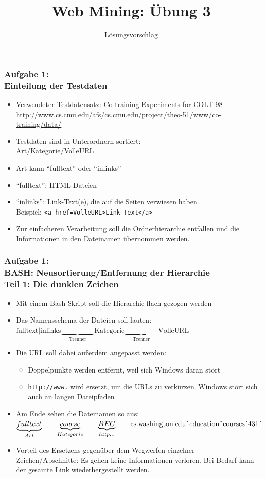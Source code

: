 \documentclass[accentcolor=tud7b,noresetcounter]{tudbeamer}
\title%
{Web Mining: Übung 3}
\subtitle{Lösungsvorschlag}
\author[Ingo Adrian und Steffen Pegenau]{}
\institute[Fachbereich Informatik]{}
\date[\today]
\begin{document}
  
  \begin{titleframe}
  \end{titleframe}
  
  \begin{frame}
  \frametitle{Aufgabe 1:\\ Einteilung der Testdaten}
  \begin{itemize}
    \item Verwendeter Testdatensatz: Co-training Experiments for COLT 98\\
    \url{http://www.cs.cmu.edu/afs/cs.cmu.edu/project/theo-51/www/co-training/data/}
    \item Testdaten sind in Unterordnern sortiert:\\
    	  Art/Kategorie/VolleURL
   \item Art kann "`fulltext"' oder "`inlinks"'
   \item "`fulltext"': HTML-Dateien
   \item "`inlinks"': Link-Text(e), die auf die Seiten verwiesen haben. \\
	Beispiel: \texttt{<a href=VolleURL>Link-Text</a>}
   \item Zur einfacheren Verarbeitung soll die Ordnerhierarchie entfallen und
   	die Informationen in den Dateinamen übernommen werden.
  \end{itemize}
  \end{frame}
  
  \begin{frame}
  \frametitle{Aufgabe 1:\\ BASH: Neusortierung/Entfernung der Hierarchie \\ Teil 1: Die dunklen Zeichen }
  \begin{itemize}
    \item Mit einem Bash-Skript soll die Hierarchie flach gezogen werden
    \item Das Namensschema der Dateien soll lauten:\\
    $\text{fulltext|inlinks}\underbrace{-----}_{\text{Trenner}}\text{Kategorie}\underbrace{-----}_{\text{Trenner}}\text{VolleURL}$
    \item Die URL soll dabei außerdem angepasst werden:
	\begin{itemize}
		\item Doppelpunkte werden entfernt, weil sich Windows daran stört
		\item \texttt{http://www.} wird ersetzt, um die URLs zu verkürzen. Windows stört sich auch an langen Dateipfaden
	\end{itemize}
    \item Am Ende sehen die Dateinamen so aus: \\
    $\underbrace{fulltext}_{Art}--\underbrace{course}_{Kategorie}--\underbrace{BEG}_{http...}--\text{cs.washington.edu\^{}education\^{}courses\^{}431\^{}}$
    \item Vorteil des Ersetzens gegenüber dem Wegwerfen einzelner Zeichen/Abschnitte: Es gehen keine Informationen verloren. Bei Bedarf kann der gesamte Link wiederhergestellt werden.
  \end{itemize}
  \end{frame}
 
\end{document}
